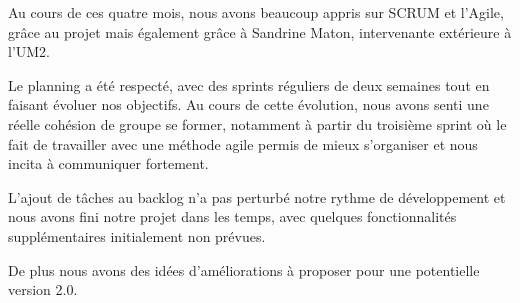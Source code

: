 Au cours de ces quatre mois, nous avons beaucoup appris sur SCRUM et l'Agile, grâce au projet mais également grâce à Sandrine Maton, intervenante extérieure à l'UM2.

Le planning a été respecté, avec des sprints réguliers de deux semaines tout en faisant évoluer nos objectifs.
Au cours de cette évolution, nous avons senti une réelle cohésion de groupe se former, notamment à partir du troisième sprint où le fait de travailler avec une méthode agile permis de mieux s'organiser et nous incita à communiquer fortement.

L'ajout de tâches au backlog n'a pas perturbé notre rythme de développement et nous avons fini notre projet dans les temps, avec quelques fonctionnalités supplémentaires initialement non prévues.

De plus nous avons des idées d'améliorations à proposer pour une potentielle version 2.0.
